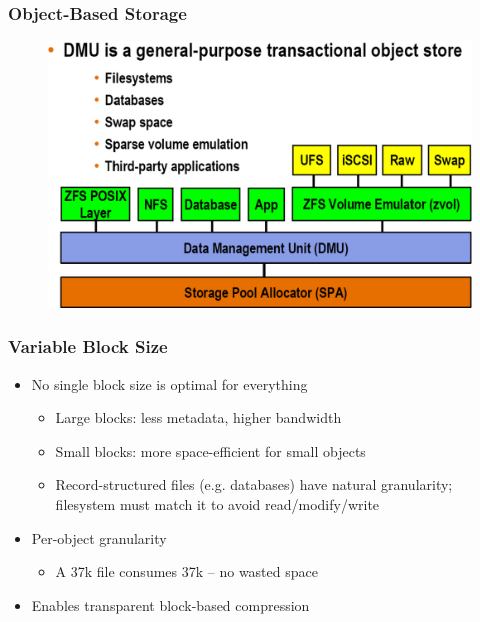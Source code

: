 % 
% 
% 
\begin{frame}[fragile]
    \frametitle{Object-Based Storage}
    \begin{figure}
    \includegraphics[width=0.8\linewidth]{figs/ZFS-storage.png}
    \end{figure}

\end{frame}
% 
% 
% 
% 
\begin{frame}[fragile]
    \frametitle{Variable Block Size}
    \begin{itemize}
        \item No single block size is optimal for everything
        \begin{itemize}
            \item Large blocks: less metadata, higher bandwidth
            \item Small blocks: more space-efficient for small objects
            \item Record-structured files (e.g. databases) have natural granularity; filesystem must match it to avoid read/modify/write
        \end{itemize}
        \item Per-object granularity
        \begin{itemize}
            \item A 37k file consumes 37k – no wasted space
        \end{itemize}
        \item Enables transparent block-based compression
    \end{itemize}
\end{frame}
